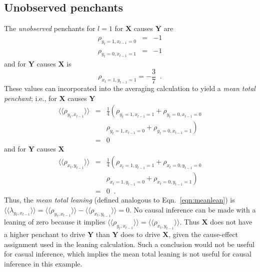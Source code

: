 \documentclass[twocolumn,aps,pre,groupedaddress]{revtex4-1}
\begin{document}
\subsection{Unobserved penchants}
The {\em unobserved} penchants for $l=1$ for $\mathbf{X}$ causes $\mathbf{Y}$ are
\begin{eqnarray*}
\rho_{y_t=1,x_{t-1}=0} &=& -1\\
\rho_{y_t=0,x_{t-1}=1} &=& -1
\end{eqnarray*}
and for $\mathbf{Y}$ causes $\mathbf{X}$ is
\begin{equation*}
\rho_{x_t=1,y_{t-1}=1}=-\frac{3}{7}\;\;.
\end{equation*}
These values can incorporated into the averaging calculation to yield a {\em mean total penchant}; i.e., for $\mathbf{X}$ causes $\mathbf{Y}$
\begin{eqnarray*}
\langle\langle \rho_{y_t,x_{t-1}} \rangle\rangle &=& \frac{1}{4}\left(\rho_{y_t=1,x_{t-1}=1} + \rho_{y_t=0,x_{t-1}=0}\right.\\
& &\left. \rho_{y_t=1,x_{t-1}=0} + \rho_{y_t=0,x_{t-1}=1}\right) \\
&=& 0
\end{eqnarray*}
and for $\mathbf{Y}$ causes $\mathbf{X}$
\begin{eqnarray*}
\langle\langle \rho_{x_t,y_{t-1}} \rangle\rangle &=& \frac{1}{4}\left(\rho_{x_t=1,y_{t-1}=1} + \rho_{x_t=0,y_{t-1}=0}\right.\\
& &\left. \rho_{x_t=1,y_{t-1}=0} + \rho_{x_t=0,y_{t-1}=1}\right)\\
&=& 0\;\;.
\end{eqnarray*}
Thus, the {\em mean total leaning} (defined analogous to Eqn.\ \ref{eqn:meanlean}) is $\langle\langle \lambda_{y_t,x_{t-1}} \rangle\rangle = \langle\langle \rho_{y_t,x_{t-1}} \rangle\rangle -  \langle\langle \rho_{x_t,y_{t-1}} \rangle\rangle = 0$.  No causal inference can be made with a leaning of zero because it implies $\langle\langle \rho_{y_t,x_{t-1}} \rangle\rangle =  \langle\langle \rho_{x_t,y_{t-1}} \rangle\rangle$.  Thus $\mathbf{X}$ does not have a higher penchant to drive $\mathbf{Y}$ than $\mathbf{Y}$ does to drive $\mathbf{X}$, given the cause-effect assignment used in the leaning calculation.  Such a conclusion would not be useful for casual inference, which implies the mean total leaning is not useful for causal inference in this example.
\end{document}
